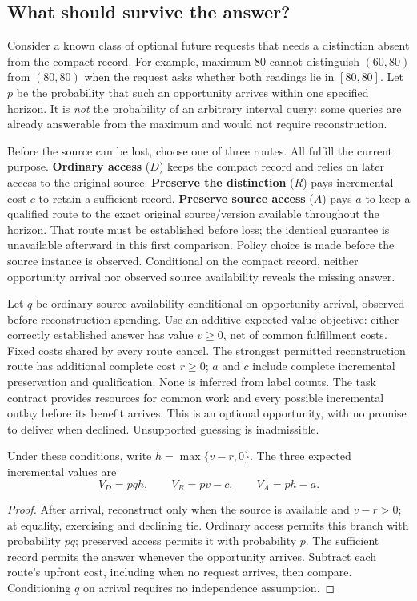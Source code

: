 \subsection{What should survive the answer?}
\label{sec:preservation}
Consider a known class of optional future requests that needs a distinction absent from the compact record. For example, maximum 80 cannot distinguish $(60,80)$ from $(80,80)$ when the request asks whether both readings lie in $[80,80]$. Let $p$ be the probability that such an opportunity arrives within one specified horizon. It is \emph{not} the probability of an arbitrary interval query: some queries are already answerable from the maximum and would not require reconstruction.

Before the source can be lost, choose one of three routes. All fulfill the current purpose. \textbf{Ordinary access} ($D$) keeps the compact record and relies on later access to the original source. \textbf{Preserve the distinction} ($R$) pays incremental cost $c$ to retain a sufficient record. \textbf{Preserve source access} ($A$) pays $a$ to keep a qualified route to the exact original source/version available throughout the horizon. That route must be established before loss; the identical guarantee is unavailable afterward in this first comparison. Policy choice is made before the source instance is observed. Conditional on the compact record, neither opportunity arrival nor observed source availability reveals the missing answer.

Let $q$ be ordinary source availability conditional on opportunity arrival, observed before reconstruction spending. Use an additive expected-value objective: either correctly established answer has value $v\geq0$, net of common fulfillment costs. Fixed costs shared by every route cancel. The strongest permitted reconstruction route has additional complete cost $r\geq0$; $a$ and $c$ include complete incremental preservation and qualification. None is inferred from label counts. The task contract provides resources for common work and every possible incremental outlay before its benefit arrives. This is an optional opportunity, with no promise to deliver when declined. Unsupported guessing is inadmissible.

\begin{proposition}
\label{prop:preservation}
Under these conditions, write $h=\max\{v-r,0\}$. The three expected incremental values are
\begin{equation}
\boxed{V_D=pqh,\qquad V_R=pv-c,\qquad V_A=ph-a.}
\label{eq:preservation}
\end{equation}
\end{proposition}
\begin{proof}
After arrival, reconstruct only when the source is available and $v-r>0$; at equality, exercising and declining tie. Ordinary access permits this branch with probability $pq$; preserved access permits it with probability $p$. The sufficient record permits the answer whenever the opportunity arrives. Subtract each route's upfront cost, including when no request arrives, then compare. Conditioning $q$ on arrival requires no independence assumption.
\end{proof}

